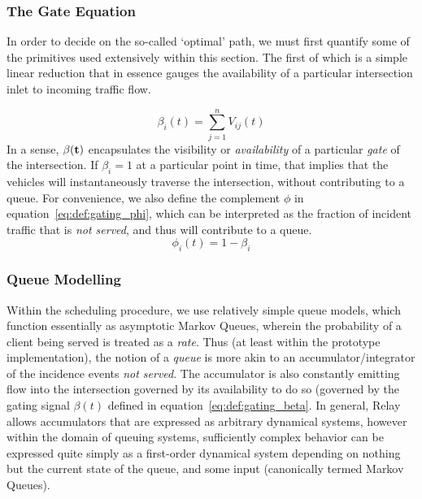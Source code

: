 \documentclass{report}
\begin{document}
\subsubsection{The Gate Equation}
\label{sec:opt:gating}

In order to decide on the so-called `optimal' path, we must first quantify some of the primitives used extensively within this section.
The first of which is a simple linear reduction that in essence gauges the availability of a particular intersection inlet to incoming traffic flow.

\begin{equation}\label{eq:def:gating_beta}
	\beta_i(t) = \sum_{j=1}^n V_{ij}(t)
\end{equation}
In a sense, $\bf{\beta}(t)$ encapsulates the visibility or \emph{availability} of a particular \emph{gate} of the intersection.
If $\beta_i = 1$ at a particular point in time, that implies that the vehicles will instantaneously traverse the intersection, without contributing to a queue.
For convenience, we also define the complement $\phi$ in equation~\eqref{eq:def:gating_phi}, which can be interpreted as the fraction of incident traffic that is \emph{not served}, and thus will contribute to a queue.
\begin{equation}\label{eq:def:gating_phi}
	\phi_i(t) = 1 - \beta_i
\end{equation}

\subsubsection{Queue Modelling}

Within the scheduling procedure, we use relatively simple queue models, which function essentially as asymptotic Markov Queues, wherein the probability of a client being served is treated as a \emph{rate}.
Thus (at least within the prototype implementation), the notion of a \emph{queue} is more akin to an accumulator/integrator of the incidence events \emph{not served}.
The accumulator is also constantly emitting flow into the intersection governed by its availability to do so (governed by the gating signal $\beta(t)$ defined  in equation~\eqref{eq:def:gating_beta}.
In general, Relay allows accumulators that are expressed as arbitrary dynamical systems, however within the domain of queuing systems, sufficiently complex behavior can be expressed quite simply as a first-order dynamical system depending on nothing but the current state of the queue, and some input (canonically termed Markov Queues).
\end{document}
